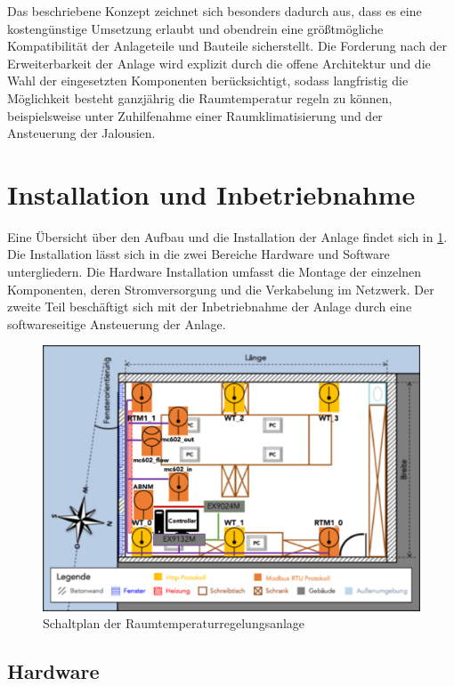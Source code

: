 Das beschriebene Konzept zeichnet sich besonders dadurch aus, dass es eine kostengünstige Umsetzung erlaubt und obendrein eine größtmögliche Kompatibilität der Anlageteile und Bauteile sicherstellt. Die Forderung nach der Erweiterbarkeit der Anlage wird explizit durch die offene Architektur und die Wahl der eingesetzten Komponenten berücksichtigt, sodass langfristig die Möglichkeit besteht ganzjährig die Raumtemperatur regeln zu können, beispielsweise unter Zuhilfenahme einer Raumklimatisierung und der Ansteuerung der Jalousien.

\section{Installation und Inbetriebnahme}

Eine Übersicht über den Aufbau und die Installation der Anlage findet sich in \ref{fig:anlagegesamt}. Die Installation lässt sich in die zwei Bereiche Hardware und Software untergliedern. Die Hardware Installation umfasst die  Montage der einzelnen Komponenten, deren Stromversorgung und die Verkabelung im Netzwerk.
Der zweite Teil beschäftigt sich mit der Inbetriebnahme der Anlage durch eine softwareseitige Ansteuerung der Anlage.

\begin{figure}
\centering
\includegraphics[width=\textwidth]{abbildungen/20160330_anlagegesamt}
\caption{Schaltplan der Raumtemperaturregelungsanlage}
\label{fig:anlagegesamt}
\end{figure}



\subsection{Hardware}

